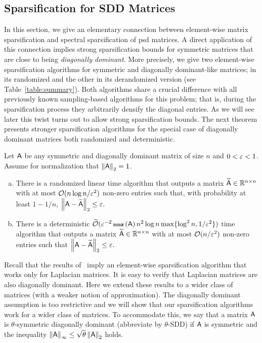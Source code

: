 \subsection{Sparsification for SDD Matrices}
In this section, we give an elementary connection between element-wise matrix sparsification and spectral sparsification of psd matrices. A direct application of this connection implies strong sparsification bounds for symmetric matrices that are close to being \emph{diagonally dominant}. More precisely, we give two element-wise sparsification algorithms for symmetric and diagonally dominant-like matrices; in its randomized and the other in its derandomized version (see Table~\ref{table:summary}). Both algorithms share a crucial difference with all previously known sampling-based algorithms for this problem; that is, during the sparsification process they arbitrarily densify the diagonal entries. As we will see later this twist turns out to allow strong sparsification bounds. The next theorem presents stronger sparsification algorithms for the special case of diagonally dominant matrices both randomized and deterministic.
%
\begin{theorem}
Let ${\mathsf{A} }$ be any symmetric and diagonally dominant matrix of size $n$ and $ 0 < \varepsilon <1$. Assume for normalization that $\left\|{\mathsf{A} }\right\|_2=1$.
\begin{enumerate}[(a)]
 \item
There is a randomized linear time algorithm that outputs a matrix $\widetilde{{\mathsf{A} }}\in \mathbb{R}^{n\times n}$ with at most $\mathcal{O}( n \log n /\varepsilon^2)$ non-zero entries such that, with probability at least $1-1/n$, $\left\|{\mathsf{A} } - \widetilde{{\mathsf{A} }}\right\|_2 \leq \varepsilon.$
\item
There is a deterministic $\widetilde{\mathcal{O}}( \varepsilon^{-2} \operatorname{\textbf{\footnotesize nnz}}\left({\mathsf{A} }\right) n^2 \log n  \max\{ \log^2 n,1/\varepsilon^2 \} )$ time algorithm that outputs a matrix $\widetilde{{\mathsf{A} }}\in \mathbb{R}^{n\times n}$ with at most $\mathcal{O}(n/\varepsilon^2)$ non-zero entries such that $\left\|{\mathsf{A} } - \widetilde{{\mathsf{A} }}\right\|_2 \leq \varepsilon.$
\end{enumerate}
\end{theorem}
%

%
Recall that the results of~\cite{graph:sparsifiers:eff_resistance,graph:sparsifiers:twice_ram} imply an element-wise sparsification algorithm that works only for Laplacian matrices. It is easy to verify that Laplacian matrices are also diagonally dominant. Here we extend these results to a wider class of matrices (with a weaker notion of approximation). The diagonally dominant assumption is too restrictive and we will show that our sparsification algorithms work for a wider class of matrices. To accommodate this, we say that a matrix ${\mathsf{A} }$ is $\theta$-symmetric diagonally dominant (abbreviate by $\theta$-SDD) if ${\mathsf{A} }$ is symmetric and the inequality $\left\|{\mathsf{A} }\right\|_\infty \leq \sqrt{\theta} \left\|{\mathsf{A} }\right\|_2$ holds.
%

